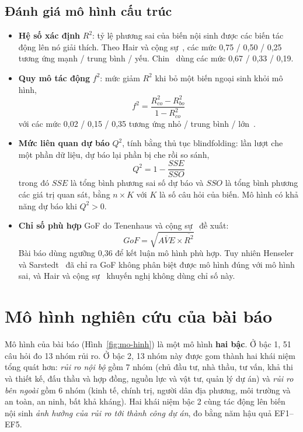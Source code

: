 \subsection{Đánh giá mô hình cấu trúc}

\begin{itemize}
  \item \textbf{Hệ số xác định} $R^2$: tỷ lệ phương sai của biến nội sinh được các biến tác động lên nó giải thích. Theo Hair và cộng sự~\cite{hair2019report}, các mức 0,75 / 0,50 / 0,25 tương ứng mạnh / trung bình / yếu. Chin~\cite{chin1998} dùng các mức 0,67 / 0,33 / 0,19.
  \item \textbf{Quy mô tác động} $f^2$: mức giảm $R^2$ khi bỏ một biến ngoại sinh khỏi mô hình,
  \begin{equation}
  f^2 = \frac{R^2_{co} - R^2_{bo}}{1 - R^2_{co}}
  \label{eq:f2}
  \end{equation}
  với các mức 0,02 / 0,15 / 0,35 tương ứng nhỏ / trung bình / lớn~\cite{cohen1988}.
  \item \textbf{Mức liên quan dự báo} $Q^2$, tính bằng thủ tục blindfolding: lần lượt che một phần dữ liệu, dự báo lại phần bị che rồi so sánh,
  \begin{equation}
  Q^2 = 1 - \frac{SSE}{SSO}
  \label{eq:q2}
  \end{equation}
  trong đó $SSE$ là tổng bình phương sai số dự báo và $SSO$ là tổng bình phương các giá trị quan sát, bằng $n \times K$ với $K$ là số câu hỏi của biến. Mô hình có khả năng dự báo khi $Q^2 > 0$.
  \item \textbf{Chỉ số phù hợp} GoF do Tenenhaus và cộng sự~\cite{tenenhaus2005} đề xuất:
  \begin{equation}
  GoF = \sqrt{\overline{AVE} \times \overline{R^2}}
  \label{eq:gof}
  \end{equation}
  Bài báo dùng ngưỡng 0,36 để kết luận mô hình phù hợp. Tuy nhiên Henseler và Sarstedt~\cite{henseler2013} đã chỉ ra GoF không phân biệt được mô hình đúng với mô hình sai, và Hair và cộng sự~\cite{hair2019report} khuyến nghị không dùng chỉ số này.
\end{itemize}

\section{Mô hình nghiên cứu của bài báo}
\label{sec:mo-hinh}

Mô hình của bài báo (Hình~\ref{fig:mo-hinh}) là một mô hình \textbf{hai bậc}. Ở bậc 1, 51 câu hỏi đo 13 nhóm rủi ro. Ở bậc 2, 13 nhóm này được gom thành hai khái niệm tổng quát hơn: \emph{rủi ro nội bộ} gồm 7 nhóm (chủ đầu tư, nhà thầu, tư vấn, khả thi và thiết kế, đấu thầu và hợp đồng, nguồn lực và vật tư, quản lý dự án) và \emph{rủi ro bên ngoài} gồm 6 nhóm (kinh tế, chính trị, người dân địa phương, môi trường và an toàn, an ninh, bất khả kháng). Hai khái niệm bậc 2 cùng tác động lên biến nội sinh \emph{ảnh hưởng của rủi ro tới thành công dự án}, đo bằng năm hậu quả EF1--EF5.


